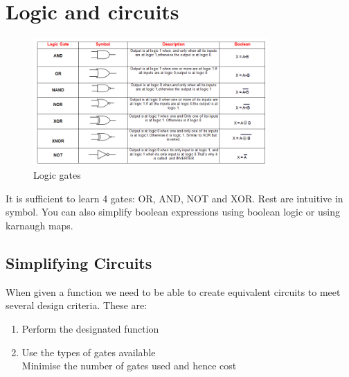 \documentclass[a4paper]{article}
\theoremstyle{plain}
\theoremstyle{definition}
\theoremstyle{remark}
\begin{document}
\section{Logic and circuits}
\begin{figure}[H]
	\centering
	\includegraphics[width=0.8\textwidth]{logic.png}
	\caption{Logic gates}
	\label{fig:logic-png}
\end{figure}
It is sufficient to learn 4 gates: OR, AND, NOT and XOR. Rest are intuitive in symbol. You can also simplify boolean expressions using boolean logic or using karnaugh maps.
\subsection{Simplifying Circuits}
When given a function we need to be able to create equivalent circuits to meet several design criteria. These are:
\begin{enumerate}
	\item Perform the designated function\\
	\item Use the types of gates available \\
	Minimise the number of gates used and hence cost 
\end{enumerate}
\end{document}
